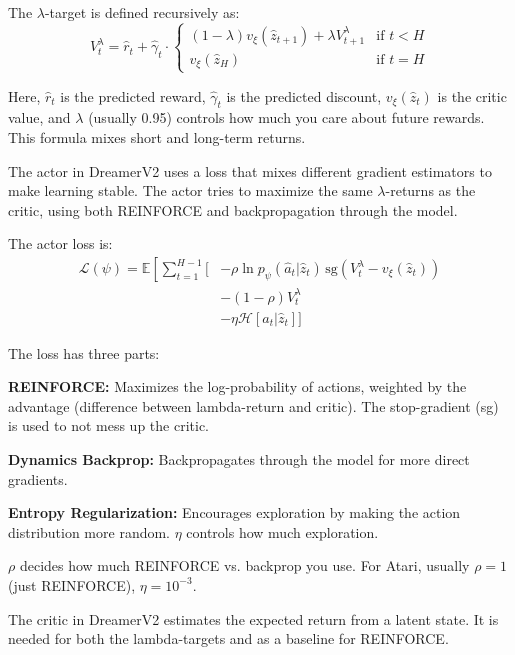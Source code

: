 \documentclass[
	english,
	ruledheaders=section,
	class=report,
	thesis={type=master},
	accentcolor=9c,
	custommargins=true,
	marginpar=false,
	parskip=half-,
	fontsize=11pt,
]{tudapub}
\begin{document}
The $\lambda$-target is defined recursively as:
\begin{equation}
	V^{\lambda}_t = \hat{r}_t + \hat{\gamma}_t \cdot \begin{cases}
		(1 - \lambda)v_\xi(\hat{z}_{t+1}) + \lambda V^{\lambda}_{t+1} & \text{if } t < H \\
		v_\xi(\hat{z}_H)                                              & \text{if } t = H
	\end{cases}
\end{equation}

Here, $\hat{r}_t$ is the predicted reward, $\hat{\gamma}_t$ is the predicted
discount, $v_\xi(\hat{z}_t)$ is the critic value, and $\lambda$ (usually 0.95)
controls how much you care about future rewards. This formula mixes short and
long-term returns.

The actor in DreamerV2 uses a loss that mixes different gradient estimators to
make learning stable. The actor tries to maximize the same $\lambda$-returns as
the critic, using both REINFORCE and backpropagation through the model.

The actor loss is:
\begin{align}
	\mathcal{L}(\psi) = \mathbb{E}\left[\sum_{t=1}^{H-1} \Big[\right. & -\rho \ln p_\psi(\hat{a}_t | \hat{z}_t) \, \text{sg}(V^{\lambda}_t - v_\xi(\hat{z}_t)) \\
	                                                                  & -(1-\rho)V^{\lambda}_t                                                                 \\
	                                                                  & -\eta \mathcal{H}[a_t|\hat{z}_t] \Big]
\end{align}

The loss has three parts:

\textbf{REINFORCE:} Maximizes the log-probability of actions, weighted by the advantage (difference between lambda-return and critic). The stop-gradient (sg) is used to not mess up the critic.

\textbf{Dynamics Backprop:} Backpropagates through the model for more direct gradients.

\textbf{Entropy Regularization:} Encourages exploration by making the action distribution more random. $\eta$ controls how much exploration.

$\rho$ decides how much REINFORCE vs. backprop you use. For Atari, usually $\rho=1$ (just REINFORCE), $\eta=10^{-3}$.

The critic in DreamerV2 estimates the expected return from a latent state. It
is needed for both the lambda-targets and as a baseline for REINFORCE.
\end{document}
